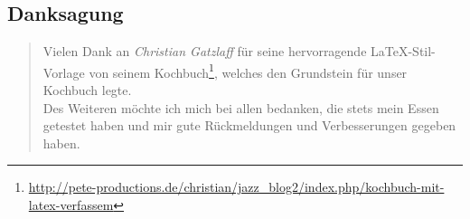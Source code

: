
\subsection*{\centering Danksagung}
\begin{quote}
Vielen Dank an \emph{Christian Gatzlaff} f\"ur seine hervorragende
\LaTeX-Stil-Vorlage von seinem
Kochbuch\footnote{%
  \url{http://pete-productions.de/christian/jazz_blog2/index.php/kochbuch-mit-latex-verfassem}
}, welches den Grundstein f\"ur unser Kochbuch legte.\\

Des Weiteren m\"ochte ich mich bei allen bedanken, die stets mein Essen
getestet haben und mir gute R\"uckmeldungen und Verbesserungen gegeben haben.
\end{quote}
